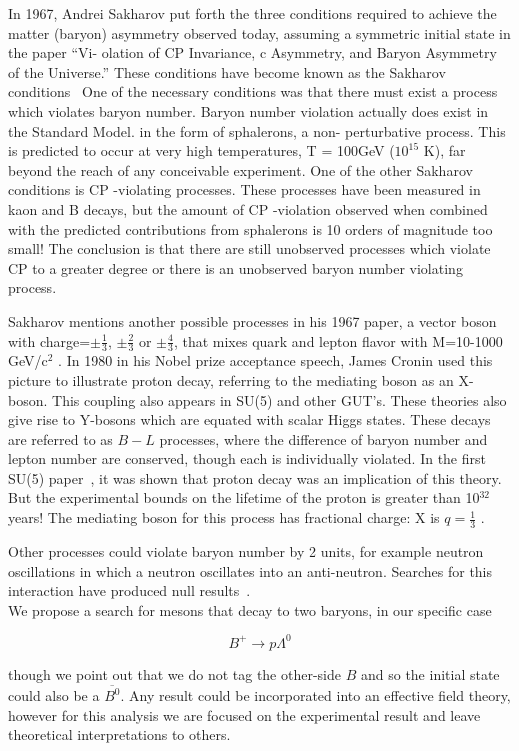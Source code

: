 In 1967, Andrei Sakharov put forth the three conditions required to achieve the matter
(baryon) asymmetry observed today, assuming a symmetric initial state in the paper “Vi-
olation of CP Invariance, c Asymmetry, and Baryon Asymmetry of the Universe.” These
conditions have become known as the Sakharov conditions~\cite{Sakharov:1967dj}
One of the necessary conditions was that there must exist a process which violates baryon number. Baryon number
violation actually does exist in the Standard Model. in the form of sphalerons, a non-
perturbative process. This is predicted to occur at very high temperatures, T = 100GeV
($10^{15}$ K), far beyond the reach of any conceivable experiment.
One of the other Sakharov conditions is CP -violating processes. These processes have been
measured in kaon and B decays, but the amount of CP -violation observed when combined
with the predicted contributions from sphalerons is 10 orders of magnitude too small! The
conclusion is that there are still unobserved processes which violate CP to a greater degree
or there is an unobserved baryon number violating process.


Sakharov mentions another possible processes in his 1967 paper, a vector boson with charge=$\pm\frac{1}{3}$,
$\pm\frac{2}{3}$ or $\pm\frac{4}{3}$,
that mixes quark and lepton flavor with M=10-1000 GeV/c$^2$ . In 1980 in his Nobel
prize acceptance speech, James Cronin used this picture to illustrate proton decay, 
referring to the mediating boson as an X-boson. This coupling also appears in SU(5) and other
GUT’s. These theories also give rise to Y-bosons which are equated with scalar Higgs
states. These decays are referred to as $B-L$ processes, where the difference of baryon
number and lepton number are conserved, though each is individually violated.
In the first SU(5) paper~\cite{Georgi:1974sy}, it was shown that proton decay was an implication of this theory.
But the experimental bounds on the lifetime of the proton is greater than 10$^{32}$ years! The
mediating boson for this process has fractional charge: X is $q=\frac{1}{3}$ . 


Other processes could violate baryon number by 2 units, for example neutron oscillations in 
which a neutron oscillates into an anti-neutron. Searches for this interaction
have produced null results~\cite{Baldo-Ceolin:1994hzw, Super-Kamiokande:2020bov}.\\

We propose a search for mesons that decay to two baryons, in our specific case

$$B^+ \rightarrow p \Lambda^0$$

though we point out that we do not tag the other-side $B$ and so the initial state
could also be a $\overline{B^0}$. Any result could be incorporated into an effective
field theory, however for this analysis we are focused on the experimental result
and leave theoretical interpretations to others.
